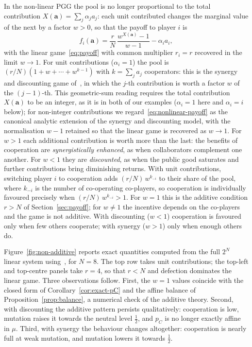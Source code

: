 \documentclass[11pt]{article}
\newcommand{\bfa}{\mathbf{a}}
\begin{document}
In the non-linear PGG the pool is no longer proportional to the total
contribution \(X(\bfa)=\sum_j \alpha_j a_j\): each unit contributed changes
the marginal value of the next by a factor \(w>0\), so that the payoff to
player \(i\) is
\begin{equation}\label{eq:nonlinear-payoff}
  f_i(\bfa) = \frac{r}{N}\,\frac{w^{X(\bfa)}-1}{w-1} - \alpha_i a_i,
\end{equation}
with the linear game~\eqref{eq:payoff} with common multiplier \(r_i=r\)
recovered in the limit \(w\to1\). For unit contributions (\(\alpha_i=1\))
the pool is \((r/N)(1+w+\cdots+w^{k-1})\) with \(k=\sum_j a_j\) cooperators:
this is the synergy and discounting game of~\cite{hauert2006synergy}, in
which the \(j\)-th contribution is worth a factor \(w\) of the
\((j-1)\)-th. This geometric-sum reading requires the total contribution
\(X(\bfa)\) to be an integer, as it is in both of our examples
(\(\alpha_i=1\) here and \(\alpha_i=i\) below); for non-integer
contributions we regard~\eqref{eq:nonlinear-payoff} as the canonical
analytic extension of the synergy and discounting model, with the
normalisation \(w-1\) retained so that the linear game is recovered as
\(w\to1\). For \(w>1\) each additional contribution is worth more than
the last: the benefits of cooperation are \emph{synergistically enhanced},
as when collaborators complement one another. For \(w<1\) they are
\emph{discounted}, as when the public good saturates and further
contributions bring diminishing returns. With unit contributions, switching
player \(i\) to cooperation adds \((r/N)\,w^{k_{-i}}\) to their share of the
pool, where \(k_{-i}\) is the number of co-operating co-players, so
cooperation is individually favoured precisely when
\((r/N)\,w^{k_{-i}}>1\). For \(w=1\) this is the additive condition \(r>N\)
of Section~\ref{sec:payoff}; for \(w\neq1\) the incentive depends on the
co-players and the game is not additive. With discounting (\(w<1\))
cooperation is favoured only when few others cooperate; with synergy
(\(w>1\)) only when enough others do.

Figure~\ref{fig:non-additive} reports exact quantities computed from the
full \(2^N\) linear system using~\cite{harry_foster_2026_19495532}, for
\(N=8\). The top row takes unit contributions; the top-left and top-centre
panels take \(r=4\),
so that \(r<N\) and defection dominates the linear game. Three observations
follow. First, the \(w=1\) values coincide with the closed form of
Corollary~\ref{cor:exact-pC} and the affine balance of
Proposition~\ref{prop:balance}, a numerical check of the additive theory.
Second, with discounting the additive pattern persists qualitatively:
cooperation is low, mutation raises it towards the neutral level
\(\tfrac{1}{2}\), and \(p_C\) is no longer exactly affine in \(\mu\). Third,
with synergy the behaviour changes altogether: cooperation is nearly full at
weak mutation, and mutation lowers it towards \(\tfrac{1}{2}\).
\end{document}
